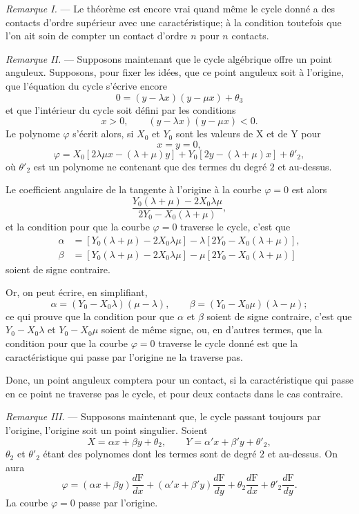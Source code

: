 \documentclass[11pt]{article}
\begin{document}
\emph{Remarque I.} --- Le théorème est encore vrai quand même le cycle donné a des contacts d’ordre supérieur avec une caractéristique; à la condition toutefois que l’on ait soin de compter un contact d’ordre $n$ pour $n$ contacts.

\emph{Remarque II.} --- Supposons maintenant que le cycle algébrique offre un point anguleux. Supposons, pour fixer les idées, que ce point anguleux soit à l’origine, que l’équation du cycle s’écrive encore
\[
0=(y-\lambda x)(y-\mu x)+\theta_3
\]
et que l’intérieur du cycle soit défini par les conditions
\[
x>0,\qquad (y-\lambda x)(y-\mu x)<0.
\]
Le polynome $\varphi$ s’écrit alors, si $X_0$ et $Y_0$ sont les valeurs de X et de Y pour
\[
x=y=0,
\]
\[
\varphi=X_0[2\lambda\mu x-(\lambda+\mu)y]+Y_0[2y-(\lambda+\mu)x]+\theta'_2,
\]
où $\theta'_2$ est un polynome ne contenant que des termes du degré $2$ et au-dessus.

Le coefficient angulaire de la tangente à l’origine à la courbe $\varphi=0$ est alors
\[
\frac{Y_0(\lambda+\mu)-2X_0\lambda\mu}{2Y_0-X_0(\lambda+\mu)},
\]
et la condition pour que la courbe $\varphi=0$ traverse le cycle, c’est que
\[
\begin{aligned}
\alpha&=[Y_0(\lambda+\mu)-2X_0\lambda\mu]-\lambda[2Y_0-X_0(\lambda+\mu)],\\
\beta&=[Y_0(\lambda+\mu)-2X_0\lambda\mu]-\mu[2Y_0-X_0(\lambda+\mu)]
\end{aligned}
\]
soient de signe contraire.

Or, on peut écrire, en simplifiant,
\[
\alpha=(Y_0-X_0\lambda)(\mu-\lambda),
\qquad
\beta=(Y_0-X_0\mu)(\lambda-\mu);
\]
ce qui prouve que la condition pour que $\alpha$ et $\beta$ soient de signe contraire, c’est que $Y_0-X_0\lambda$ et $Y_0-X_0\mu$ soient de même signe, ou, en d’autres termes, que la condition pour que la courbe $\varphi=0$ traverse le cycle donné est que la caractéristique qui passe par l’origine ne la traverse pas.

Donc, un point anguleux comptera pour un contact, si la caractéristique qui passe en ce point ne traverse pas le cycle, et pour deux contacts dans le cas contraire.

\emph{Remarque III.} --- Supposons maintenant que, le cycle passant toujours par l’origine, l’origine soit un point singulier. Soient
\[
X=\alpha x+\beta y+\theta_2,
\qquad
Y=\alpha'x+\beta'y+\theta'_2,
\]
$\theta_2$ et $\theta'_2$ étant des polynomes dont les termes sont de degré $2$ et au-dessus. On aura
\[
\varphi=(\alpha x+\beta y)\frac{d\mathrm F}{dx}+(\alpha'x+\beta'y)\frac{d\mathrm F}{dy}
+\theta_2\frac{d\mathrm F}{dx}+\theta'_2\frac{d\mathrm F}{dy}.
\]
La courbe $\varphi=0$ passe par l’origine.
\end{document}

